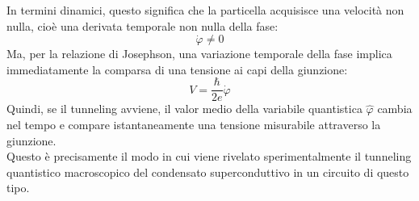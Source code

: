 In termini dinamici, questo significa che la particella acquisisce una velocità non nulla, cioè una derivata temporale non nulla della fase:
\begin{equation*}
    \dot{\varphi}\neq0
\end{equation*}
Ma, per la relazione di Josephson, una variazione temporale della fase implica immediatamente la comparsa di una tensione ai capi della giunzione:
\begin{equation*}
    V
    =
    \frac{\hbar}{2e}
    \dot{\varphi}
\end{equation*}
Quindi, se il tunneling avviene, il valor medio della variabile quantistica $\hat{\varphi}$ cambia nel tempo e compare istantaneamente una tensione misurabile attraverso la giunzione.\\
Questo è precisamente il modo in cui viene rivelato sperimentalmente il tunneling quantistico macroscopico del condensato superconduttivo in un circuito di questo tipo.
